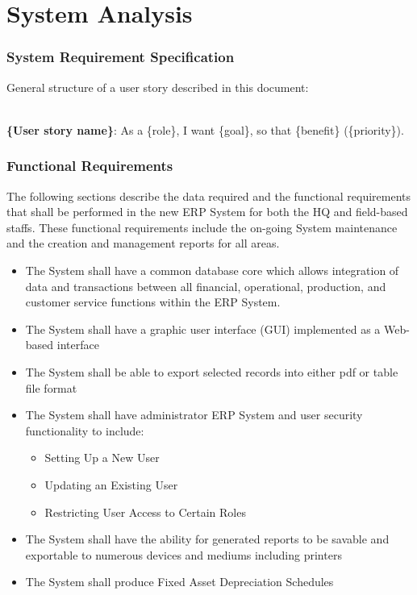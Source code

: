 \chapter{System Analysis}

\subsection{System Requirement Specification}

General structure of a user story described in this document: 
\\ \\
\begin{normalsize}
\textbf{\{User story name\}}: As a \{role\}, I want \{goal\}, so that \{benefit\} (\{priority\}).
\end{normalsize}

\subsection{Functional Requirements}
The following sections describe the data required and the functional requirements that shall be performed in the new ERP System for both the HQ and field-based staffs.  These functional requirements include the on-going System maintenance and the creation and management reports for all areas.

\begin{itemize}
	\item The System shall have a common database core which allows integration of data and transactions between all financial, operational, production, and customer service functions within the ERP System.
	\item The System shall have a graphic user interface (GUI) implemented  as a Web-based interface
	\item The System shall be able to export selected records into either pdf or table file format
	\item The System shall have administrator ERP System and user security functionality to include:
		\begin{itemize}
			\item Setting Up a New User
			\item Updating an Existing User
			\item Restricting User Access to Certain Roles
		\end{itemize}
	\item The System shall have the ability for generated reports to be savable and exportable to numerous devices and mediums including printers
	\item The System shall produce Fixed Asset Depreciation Schedules
\end{itemize}

